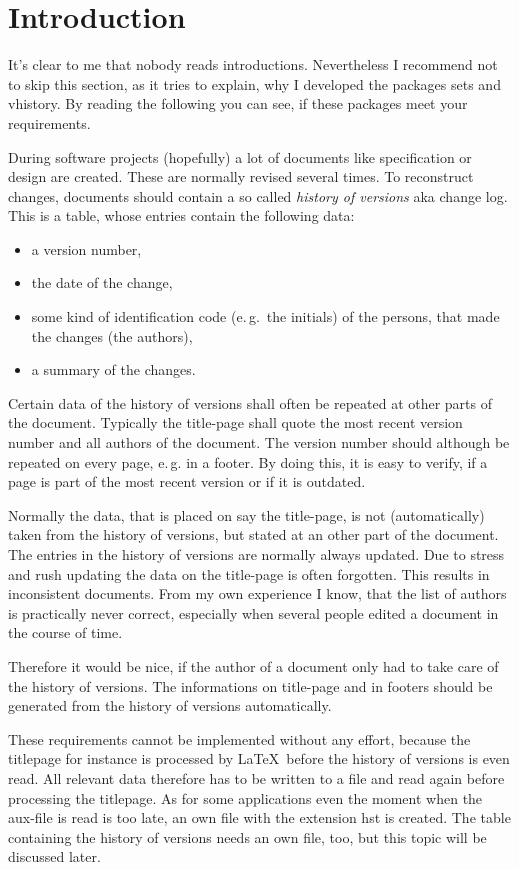 \section{Introduction}\label{introduction}
It's clear to me that nobody reads introductions. Nevertheless I recommend not to skip this section, as it tries to explain, why I developed the packages sets and vhistory.
By reading the following you can see, if these packages meet your requirements.

During software projects (hopefully) a lot of documents like specification or design are created. These are normally revised several times. To reconstruct changes, documents should contain a so called \emph{history of versions} aka change log. This is a table, whose entries contain the following data:
\begin{itemize}
	\item a version number,
	\item the date of the change,
	\item some kind of identification code (e.\,g.\ the initials) of the persons, that
	made the changes (the authors),
	\item a summary of the changes.
\end{itemize}

Certain data of the history of versions shall often be repeated at other parts of the document. Typically the title-page shall quote the most recent version number and all authors of the document. The version number should although be repeated on every page, e.\,g. in a footer. By doing this, it is easy to verify, if a page is part of the most recent version or if it is outdated.

Normally the data, that is placed on say the title-page, is not (automatically) taken from the history of versions, but stated at an other part of the document. The entries in the history of versions are normally always updated. Due to stress and rush updating the data on the title-page is often forgotten. This results in inconsistent documents.
From my own experience I know, that the list of authors is practically never correct, especially when several people edited a document in the course of time.

Therefore it would be nice, if the author of a document only had to take care of the history of versions. The informations on title-page and in footers should be generated from the history of versions automatically.

These requirements cannot be implemented without any effort, because the titlepage for instance is processed by \LaTeX\ before the history of versions is even read. 
All relevant data therefore has to be written to a file and read again before processing the titlepage. As for some applications even the moment when the aux-file is read is too late, an own file with the extension hst is created.
The table containing the history of versions needs an own file, too, but this topic will be discussed later.


